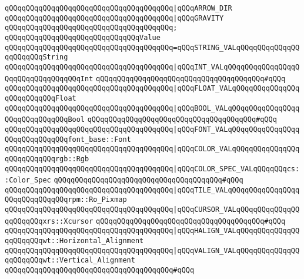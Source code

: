 \verb|qQQqqQQqqQQqqQQqqQQqqQQqqQQqqQQqqQQqqQQq|\verb#|qQQqARROW_DIR#\newline
\verb|qQQqqQQqqQQqqQQqqQQqqQQqqQQqqQQqqQQqqQQq|\verb#|qQQqGRAVITY#\newline
\verb|qQQqqQQqqQQqqQQqqQQqqQQqqQQqqQQqqQQqqQQq;|\newline
\newline
\verb|qQQqqQQqqQQqqQQqqQQqqQQqqQQqqQQqValue|\newline
\verb|qQQqqQQqqQQqqQQqqQQqqQQqqQQqqQQqqQQqqQQq=qQQqSTRING_VALqQQqqQQqqQQqqQQqqQQqqQQqString|\newline
\verb|qQQqqQQqqQQqqQQqqQQqqQQqqQQqqQQqqQQqqQQq|\verb#|qQQqINT_VALqQQqqQQqqQQqqQQqqQQqqQQqqQQqqQQqqQQqInt#\newline
\verb|qQQqqQQqqQQqqQQqqQQqqQQqqQQqqQQqqQQqqQQq#qQQq|\newline
\verb|qQQqqQQqqQQqqQQqqQQqqQQqqQQqqQQqqQQqqQQq|\verb#|qQQqFLOAT_VALqQQqqQQqqQQqqQQqqQQqqQQqqQQqFloat#\newline
\verb|qQQqqQQqqQQqqQQqqQQqqQQqqQQqqQQqqQQqqQQq|\verb#|qQQqBOOL_VALqQQqqQQqqQQqqQQqqQQqqQQqqQQqqQQqBool#\newline
\verb|qQQqqQQqqQQqqQQqqQQqqQQqqQQqqQQqqQQqqQQq#qQQq|\newline
\verb|qQQqqQQqqQQqqQQqqQQqqQQqqQQqqQQqqQQqqQQq|\verb#|qQQqFONT_VALqQQqqQQqqQQqqQQqqQQqqQQqqQQqqQQqfont_base::Font#\newline
\verb|qQQqqQQqqQQqqQQqqQQqqQQqqQQqqQQqqQQqqQQq|\verb#|qQQqCOLOR_VALqQQqqQQqqQQqqQQqqQQqqQQqqQQqrgb::Rgb#\newline
\verb|qQQqqQQqqQQqqQQqqQQqqQQqqQQqqQQqqQQqqQQq|\verb#|qQQqCOLOR_SPEC_VALqQQqqQQqcs::Color_Spec#\newline
\verb|qQQqqQQqqQQqqQQqqQQqqQQqqQQqqQQqqQQqqQQq#qQQq|\newline
\verb|qQQqqQQqqQQqqQQqqQQqqQQqqQQqqQQqqQQqqQQq|\verb#|qQQqTILE_VALqQQqqQQqqQQqqQQqqQQqqQQqqQQqqQQqrpm::Ro_Pixmap#\newline
\verb|qQQqqQQqqQQqqQQqqQQqqQQqqQQqqQQqqQQqqQQq|\verb#|qQQqCURSOR_VALqQQqqQQqqQQqqQQqqQQqqQQqxrs::Xcursor#\newline
\verb|qQQqqQQqqQQqqQQqqQQqqQQqqQQqqQQqqQQqqQQq#qQQq|\newline
\verb|qQQqqQQqqQQqqQQqqQQqqQQqqQQqqQQqqQQqqQQq|\verb#|qQQqHALIGN_VALqQQqqQQqqQQqqQQqqQQqqQQqwt::Horizontal_Alignment#\newline
\verb|qQQqqQQqqQQqqQQqqQQqqQQqqQQqqQQqqQQqqQQq|\verb#|qQQqVALIGN_VALqQQqqQQqqQQqqQQqqQQqqQQqwt::Vertical_Alignment#\newline
\verb|qQQqqQQqqQQqqQQqqQQqqQQqqQQqqQQqqQQqqQQq#qQQq|\newline
